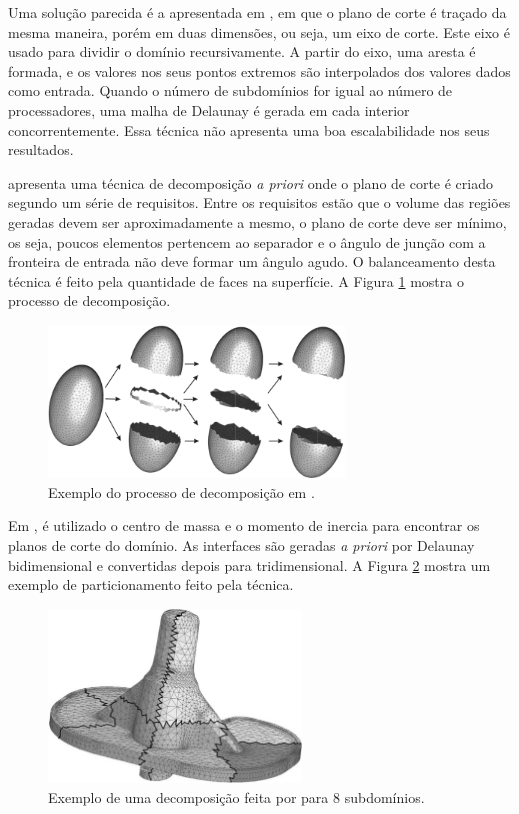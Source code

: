 Uma solução parecida é a apresentada em \cite{bib:Lammer00}, em que o plano de corte é traçado da mesma maneira, porém em duas dimensões, ou seja, um eixo de corte. Este eixo é usado para dividir o domínio recursivamente. A partir do eixo, uma aresta é formada, e os valores nos seus pontos extremos são interpolados dos valores dados como entrada. Quando o número de subdomínios for igual ao número de processadores, uma malha de Delaunay é gerada em cada interior concorrentemente. Essa técnica não apresenta uma boa escalabilidade nos seus resultados.


\cite{bib:JURCZYK07} apresenta uma técnica de decomposição \textit{a priori} onde o plano de corte é criado segundo um série de requisitos. Entre os requisitos estão que o volume das regiões geradas devem ser aproximadamente a mesmo, o plano de corte deve ser mínimo, os seja, poucos elementos pertencem ao separador e o ângulo de junção com a fronteira de entrada não deve formar um ângulo agudo. O balanceamento desta técnica é feito pela quantidade de faces na superfície. A Figura \ref{fig:jurczyk} mostra o processo de decomposição.

 
 \begin{figure}[htbp]
     \centering
     \includegraphics[width=0.7\textwidth]{fig/jurczyk.png}
     \caption{Exemplo do processo de decomposição em \cite{bib:JURCZYK07}.}
     \label{fig:jurczyk}
 \end{figure} 


Em \cite{bib:ANDRA08}, é utilizado o centro de massa e o momento de inercia para encontrar os planos de corte do domínio. As interfaces são geradas \textit{a priori} por Delaunay bidimensional e convertidas depois para tridimensional. A Figura \ref{fig:andra} mostra um exemplo de particionamento feito pela técnica.

 \begin{figure}[htbp]
     \centering
     \includegraphics[width=0.6\textwidth]{fig/andra.png}
     \caption{Exemplo de uma decomposição feita por \cite{bib:ANDRA08} para 8 subdomínios.}
     \label{fig:andra}
 \end{figure}


